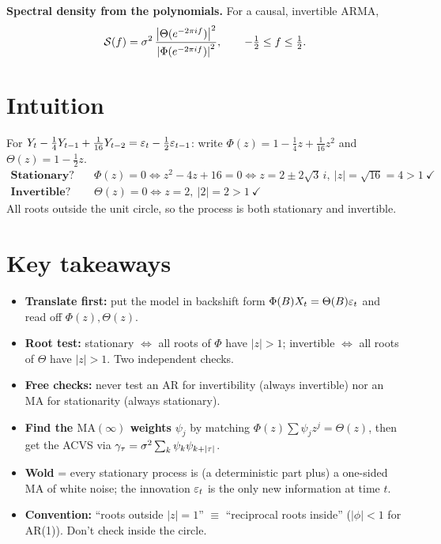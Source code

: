 \documentclass[11pt]{article}
\begin{document}
\textbf{Spectral density from the polynomials.} For a causal, invertible ARMA,
\[
\mathcal{S}(f)=\sigma^2\,\frac{\left\lvert \Theta(e^{-2\pi i f}) \right\rvert^2}{\left\lvert \Phi(e^{-2\pi i f}) \right\rvert^2},\qquad -\tfrac12\le f\le\tfrac12.
\]

\section*{Intuition}

\begin{exmpl}
For $Y_t-\tfrac14 Y_{t-1}+\tfrac1{16}Y_{t-2}=\varepsilon_t-\tfrac12\varepsilon_{t-1}$: write
$\Phi(z)=1-\tfrac14 z+\tfrac1{16}z^2$ and $\Theta(z)=1-\tfrac12 z$.
\[
\begin{aligned}
\textbf{Stationary?}\quad &\Phi(z)=0\iff z^2-4z+16=0\iff z=2\pm 2\sqrt3\,i,\ |z|=\sqrt{16}=4>1\ \checkmark\\
\textbf{Invertible?}\quad &\Theta(z)=0\iff z=2,\ |2|=2>1\ \checkmark
\end{aligned}
\]
All roots outside the unit circle, so the process is both stationary and invertible.
\end{exmpl}

\section*{Key takeaways}

\begin{retenir}
\begin{itemize}
  \item \textbf{Translate first:} put the model in backshift form $\Phi(B)X_t=\Theta(B)\varepsilon_t$ and read off $\Phi(z),\Theta(z)$.
  \item \textbf{Root test:} stationary $\iff$ all roots of $\Phi$ have $|z|>1$; invertible $\iff$ all roots of $\Theta$ have $|z|>1$. Two independent checks.
  \item \textbf{Free checks:} never test an AR for invertibility (always invertible) nor an MA for stationarity (always stationary).
  \item \textbf{Find the $\mathrm{MA}(\infty)$ weights} $\psi_j$ by matching $\Phi(z)\sum\psi_j z^j=\Theta(z)$, then get the ACVS via $\gamma_\tau=\sigma^2\sum_k\psi_k\psi_{k+\left\lvert \tau \right\rvert}$.
  \item \textbf{Wold} = every stationary process is (a deterministic part plus) a one-sided MA of white noise; the innovation $\varepsilon_t$ is the only new information at time $t$.
  \item \textbf{Convention:} ``roots outside $|z|=1$'' $\equiv$ ``reciprocal roots inside'' ($|\phi|<1$ for AR(1)). Don't check inside the circle.
\end{itemize}
\end{retenir}
\end{document}
